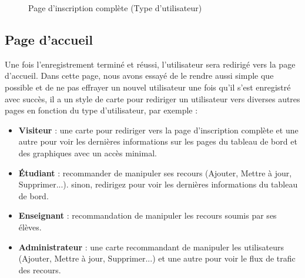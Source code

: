 \documentclass[12pt]{report}
\begin{document}
\newpage

\begin{figure}[h]
\centering
  \caption{Page d'inscription complète (Type d'utilisateur)}
\end{figure}

\subsection{Page d'accueil}

Une fois l'enregistrement terminé et réussi, l'utilisateur sera redirigé vers la page d'accueil. Dans cette page, nous avons essayé de le rendre aussi simple que possible et de ne pas effrayer un nouvel utilisateur une fois qu'il s'est enregistré avec succès, il a un style de carte pour rediriger un utilisateur vers diverses autres pages en fonction du type d'utilisateur, par exemple :

\begin{itemize}
  \item \textbf{Visiteur} : une carte pour rediriger vers la page d'inscription complète et une autre pour voir les dernières informations sur les pages du tableau de bord et des graphiques avec un accès minimal.
  \item \textbf{Étudiant} : recommander de manipuler ses recours (Ajouter, Mettre à jour, Supprimer...). sinon, redirigez pour voir les dernières informations du tableau de bord.
  \item \textbf{Enseignant} : recommandation de manipuler les recours soumis par ses élèves.
  \item \textbf{Administrateur} : une carte recommandant de manipuler les utilisateurs (Ajouter, Mettre à jour, Supprimer...)
et une autre pour voir le flux de trafic des recours.
\end{itemize}
\end{document}
